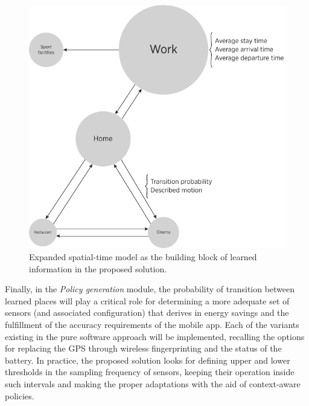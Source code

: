 \documentclass[ENG,PhD]{cinvestav}
\begin{document}
\begin{figure}[t]
  \centering
  \includegraphics[scale=0.85]{mobility-graph}
  \caption{Expanded spatial-time model as the building block of learned information in the proposed solution.}
  \label{fig:expanded-spatial-time model}
\end{figure}

Finally, in the \emph{Policy generation} module, the probability of transition between learned places will play a critical role for determining a more adequate set of sensors (and associated configuration) that derives in energy savings and the fulfillment of the accuracy requirements of the mobile app.
Each of the variants existing in the pure software approach will be implemented, recalling the options for replacing the GPS through wireless fingerprinting and the status of the battery.
In practice, the proposed solution looks for defining upper and lower thresholds in the sampling frequency of sensors, keeping their operation inside such intervals and making the proper adaptations with the aid of context-aware policies.
\end{document}
